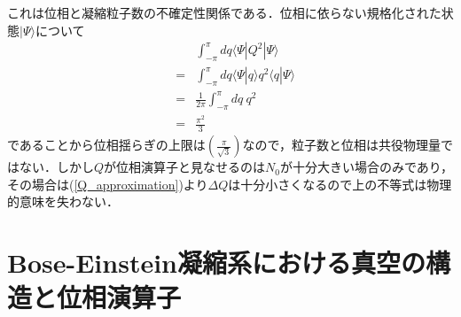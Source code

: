 \documentclass[10.5pt,a4paper]{jreport}
\begin{document}
これは位相と凝縮粒子数の不確定性関係である．位相に依らない規格化された状態$|\Psi\rangle$について
\begin{eqnarray}
  \nonumber &&\int_{-\pi}^{\pi} dq\langle \Psi|Q^2|\Psi\rangle\\
  \nonumber &=&\int_{-\pi}^{\pi} dq\langle \Psi|q\rangle q^2\langle q |\Psi\rangle\\
  \nonumber &=&\frac{1}{2\pi}\int_{-\pi}^{\pi} dq\ q^2\\
  &=&\frac{\pi^2}{3}
\end{eqnarray}
であることから位相揺らぎの上限は$\left(\frac{\pi}{\sqrt{3}}\right)$なので，粒子数と位相は共役物理量ではない．しかし$Q$が位相演算子と見なせるのは$N_0$が十分大きい場合のみであり，その場合は(\ref{Q_approximation})より$\Delta Q$は十分小さくなるので上の不等式は物理的意味を失わない．
\section{Bose-Einstein凝縮系における真空の構造と位相演算子}
\end{document}
